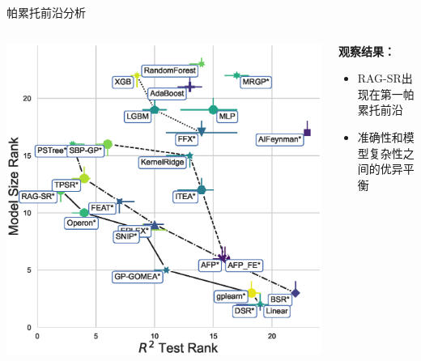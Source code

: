 \documentclass[aspectratio=1610]{beamer}
\begin{document}
    \begin{frame}{帕累托前沿分析}
        \begin{columns}
            \begin{column}{0.48\textwidth}
                \begin{center}
                    \includegraphics[width=\textwidth]{figs/pareto_plot_r2_test_rank_model_size_rank.eps}
                \end{center}
            \end{column}

            \begin{column}{0.48\textwidth}
                \textbf{观察结果：}
                \begin{itemize}
                    \item RAG-SR出现在第一帕累托前沿
                    \item 准确性和模型复杂性之间的优异平衡
                \end{itemize}
            \end{column}
        \end{columns}
    \end{frame}
\end{document}
